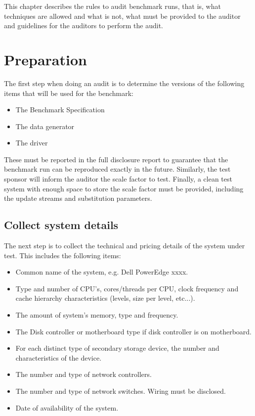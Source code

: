 

This chapter describes the rules to audit benchmark runs, that is, what
techniques are allowed and what is not, what must be provided to the auditor
and guidelines for the auditors to perform the audit. 

\section{Preparation}

The first step when doing an audit is to determine the versions of the
following items that will be used for the benchmark:

\begin{itemize}
  \item The Benchmark Specification
  \item The data generator
  \item The driver
\end{itemize}

These must be reported in the full disclosure report to guarantee that the
benchmark run can be reproduced exactly in the future. Similarly, the test
sponsor will inform the auditor the scale factor to test. Finally, a clean test
system with enough space to store the scale factor must be provided, including
the update streams and substitution parameters. 


\subsection{Collect system details}

The next step is to collect the technical and pricing details of the system
under test. This includes the following items:

\begin{itemize}
\item Common name of the system, e.g. Dell PowerEdge xxxx.
\item Type and number of CPU's, cores/threads per CPU, clock frequency and cache hierarchy characteristics (levels, size per level, etc...).
\item The amount of system's memory, type and frequency.
\item The Disk controller or motherboard type if disk controller is on motherboard.
\item For each distinct type of secondary storage device, the number and characteristics of the device.
\item The number and type of network controllers.
\item The number and type of network switches. Wiring must be disclosed.
\item Date of availability of the system.
\end{itemize}

